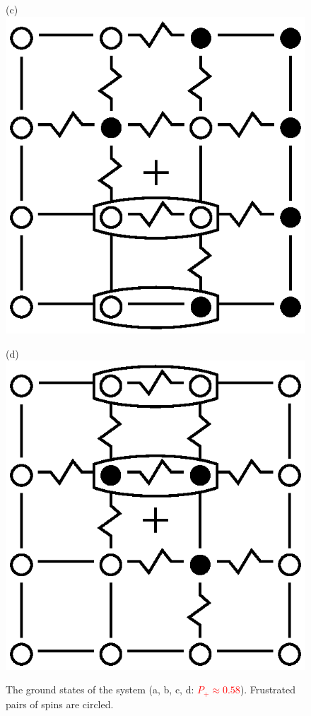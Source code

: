 \documentclass[preprint,12pt]{elsarticle}
\begin{document}
\begin{figure}[H]
\begin{minipage}[h]{0.2\linewidth}
		\end{minipage}
		\hfill
		\begin{minipage}[h]{0.2\linewidth}
			\centering(c)
			\includegraphics[width=1\linewidth]{pictures/Cl1_Type2_gs3.eps}
		\end{minipage}
		\hfill
		\begin{minipage}[h]{0.2\linewidth}
			\centering(d)
			\includegraphics[width=1\linewidth]{pictures/Cl1_Type2_gs4.eps}
		\end{minipage}
		\caption{The ground states of the system (a, b, c, d: \textcolor{red}{  $P_+\approx0.58$}). Frustrated pairs of spins are circled.}
		\label{fig:4x4.1}
		
	\end{figure}
	
\end{document}
